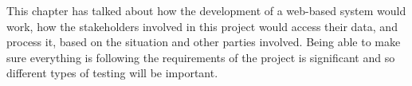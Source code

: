\documentclass[../main.tex]{subfiles}
\begin{document}
\raggedright
This chapter has talked about how the development of a web-based system would work, how the stakeholders involved in this project would access their data, and process it, based on the situation and other parties involved. Being able to make sure everything is following the requirements of the project is significant and so different types of testing will be important. 
\end{document}
